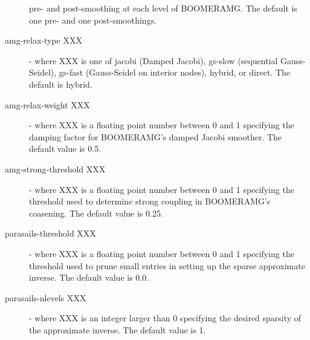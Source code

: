 \begin{description}
                       pre- and post-smoothing at each level of BOOMERAMG.
                       The default is one pre- and one post-smoothings.
\item[amg-relax-type XXX] - where XXX is one of {\sf jacobi} (Damped Jacobi),
                       {\sf gs-slow} (sequential Gauss-Seidel), {\sf gs-fast}
                       (Gauss-Seidel on interior nodes), {\sf hybrid},
                       or {\sf direct}. The default is {\sf hybrid}.
\item[amg-relax-weight XXX] - where XXX is a floating point number between 0 and 1
                       specifying the damping factor for BOOMERAMG's damped
                       Jacobi smoother.  The default value is 0.5.
\item[amg-strong-threshold XXX] - where XXX is a floating point number between 0 
                       and 1 specifying the threshold used to determine
                       strong coupling in BOOMERAMG's coasening.  The default 
                       value is 0.25.
\item[parasails-threshold XXX] - where XXX is a floating point number between 0 
                       and 1 specifying the threshold used to prune small entries
                       in setting up the sparse approximate inverse.  The default
                       value is 0.0.
\item[parasails-nlevels XXX] - where XXX is an integer larger than 0 specifying 
                       the desired sparsity of the approximate inverse.  The
                       default value is 1.
\end{description}


%
%

%

